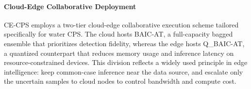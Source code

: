 \documentclass[pdflatex,sn-mathphys-num]{sn-jnl}%
\theoremstyle{thmstyleone}
\theoremstyle{thmstyletwo}%
\theoremstyle{thmstylethree}%
\begin{document}
\begin{algorithm}[t]
\caption{Cloud--Edge Collaborative Execution}\label{alg: collaborative_execution}
\DontPrintSemicolon
{}
\end{algorithm}

\paragraph{Cloud-Edge Collaborative Deployment}    
CE-CPS employs a two-tier cloud-edge collaborative execution scheme tailored specifically for water CPS. The cloud hosts BAIC-AT, a full-capacity bagged ensemble that prioritizes detection fidelity, whereas the edge hosts Q\_BAIC-AT, a quantized counterpart that reduces memory usage and inference latency on resource-constrained devices. This division reflects a widely used principle in edge intelligence: keep common-case inference near the data source, and escalate only the uncertain samples to cloud nodes to control bandwidth and compute cost.
\end{document}
